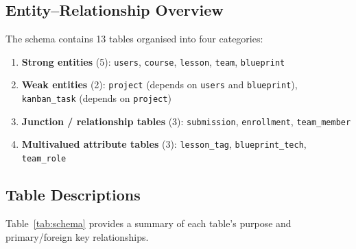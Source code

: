 \documentclass[12pt,a4paper]{article}
\begin{document}
\subsection{Entity--Relationship Overview}

The schema contains 13 tables organised into four categories:

\begin{enumerate}[label=\arabic*., itemsep=2pt]
    \item \textbf{Strong entities} (5): \texttt{users}, \texttt{course}, \texttt{lesson},
          \texttt{team}, \texttt{blueprint}
    \item \textbf{Weak entities} (2): \texttt{project} (depends on \texttt{users} and
          \texttt{blueprint}), \texttt{kanban\_task} (depends on \texttt{project})
    \item \textbf{Junction / relationship tables} (3): \texttt{submission},
          \texttt{enrollment}, \texttt{team\_member}
    \item \textbf{Multivalued attribute tables} (3): \texttt{lesson\_tag},
          \texttt{blueprint\_tech}, \texttt{team\_role}
\end{enumerate}

\subsection{Table Descriptions}

Table~\ref{tab:schema} provides a summary of each table's purpose and primary/foreign key
relationships.
\end{document}
